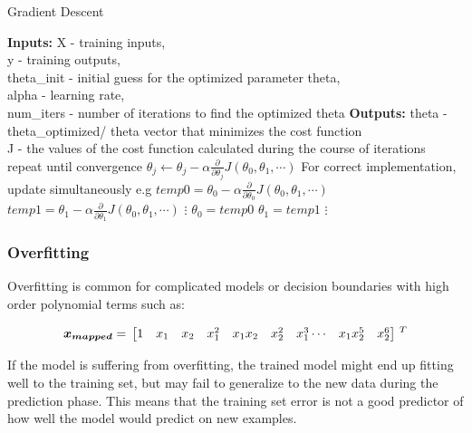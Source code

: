  \begin{algorithm}
   \caption{Gradient Descent}
    \begin{algorithmic}[1]
           \State \textbf{Inputs:} X - training inputs, \\
           \qquad \qquad y - training outputs, \\
           \qquad \qquad theta\_init - initial guess for the optimized parameter theta,\\ 
           \qquad \qquad alpha - learning rate, \\
           \qquad \qquad num\_iters - number of iterations to find the optimized theta
           \State \textbf{Outputs:} theta - theta\_optimized/ theta vector that minimizes the cost function \\
           \qquad \qquad J - the values of the cost function calculated during the course of iterations
    \State repeat until convergence {
    \State $\theta_j \leftarrow \theta_j - \alpha \frac{\partial}{\partial \theta_j}J(\theta_0, \theta_1, \cdots)$
    	 \State For correct implementation, update simultaneously e.g
	 \State 	\qquad  $temp0 = \theta_0 - \alpha \frac{\partial}{\partial \theta_0}J(\theta_0, \theta_1, \cdots)$
	 \State 	\qquad  $temp1 = \theta_1 - \alpha \frac{\partial}{\partial \theta_1}J(\theta_0, \theta_1, \cdots)$
          \State 	\qquad  \qquad $\vdots$
          \State 	\qquad  $\theta_0 = temp0$
	 \State 	\qquad  $\theta_1 = temp1$
	 \State 	\qquad  \qquad $\vdots$
		 }
       \EndFunction
\end{algorithmic}
\end{algorithm}

\fi

\subsubsection{Overfitting}

Overfitting is common for complicated models or decision boundaries with high order polynomial terms such as:

\begin{equation}{\label{eqn:featureMapping2}}
\bm{x_{mapped}}
=\,
\begin{bmatrix}
1 & x_1 & x_2 & x_1^2 & x_1x_2 & x_2^2 & x_1^3 \cdots & x_1x_2^5 & x_2^6 
\end{bmatrix}
\,^ T
\end{equation} 

If the model is suffering from overfitting, the trained model might end up fitting well to the training set, but may fail to generalize to the new data during the prediction phase. 
This means that the training set error is not a good predictor of how well the model would predict on new examples.

